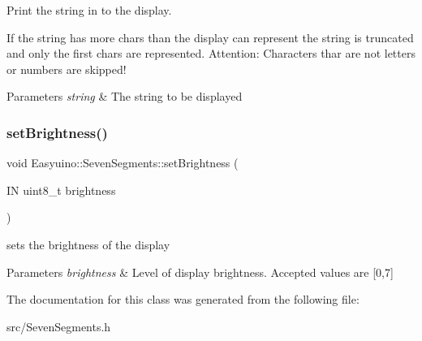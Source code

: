Print the string in to the display. 

If the string has more chars than the display can represent the string is truncated and only the first chars are represented. Attention\+: Characters thar are not letters or numbers are skipped! 
\begin{DoxyParams}{Parameters}
{\em string} & The string to be displayed \\
\hline
\end{DoxyParams}
\mbox{\label{class_easyuino_1_1_seven_segments_acda60844df104bb1580a3a3475ce402d}} 
\subsubsection{\texorpdfstring{set\+Brightness()}{setBrightness()}}
{\footnotesize\ttfamily void Easyuino\+::\+Seven\+Segments\+::set\+Brightness (\begin{DoxyParamCaption}\item[{IN uint8\+\_\+t}]{brightness }\end{DoxyParamCaption})}



sets the brightness of the display 


\begin{DoxyParams}{Parameters}
{\em brightness} & Level of display brightness. Accepted values are \mbox{[}0,7\mbox{]} \\
\hline
\end{DoxyParams}


The documentation for this class was generated from the following file\+:\begin{DoxyCompactItemize}
\item 
src/Seven\+Segments.\+h\end{DoxyCompactItemize}

